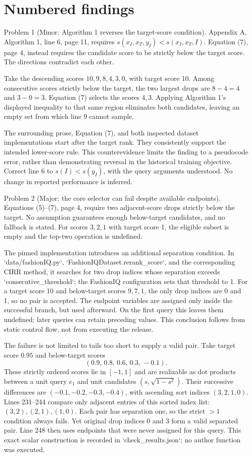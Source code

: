 \documentclass[10pt]{article}
\begin{document}
\section*{Numbered findings}
Problem 1 (Minor: Algorithm 1 reverses the target-score condition).  Appendix A, Algorithm 1, line 6, page 11, requires \(s(x_I,x_T,y_I)<s(x_I,x_T,I)\). Equation (7), page 4, instead requires the candidate score to be strictly below the target score. The directions contradict each other.\par
Take the descending scores \(10,9,8,4,3,0\), with target score 10. Among consecutive scores strictly below the target, the two largest drops are \(8-4=4\) and \(3-0=3\). Equation (7) selects the scores \(4,3\). Applying Algorithm 1’s displayed inequality to that same region eliminates both candidates, leaving an empty set from which line 9 cannot sample.\par
The surrounding prose, Equation (7), and both inspected dataset implementations start after the target rank. They consistently support the intended lower-score rule. This counterevidence limits the finding to a pseudocode error, rather than demonstrating reversal in the historical training objective. Correct line 6 to \(s(I)<s(y_I)\), with the query arguments understood. No change in reported performance is inferred.\par
Problem 2 (Major: the core selector can fail despite available endpoints).  Equations (5)–(7), page 4, require two adjacent-score drops strictly below the target. No assumption guarantees enough below-target candidates, and no fallback is stated. For scores \(3,2,1\) with target score 1, the eligible subset is empty and the top-two operation is undefined.\par
The pinned implementation introduces an additional separation condition. In `data/fashionIQ.py`, `FashionIQDataset.rerank\_score`, and the corresponding CIRR method, it searches for two drop indices whose separation exceeds `consecutive\_threshold`; the FashionIQ configuration sets that threshold to 1. For a target score 10 and below-target scores \(9,7,1\), the only drop indices are 0 and 1, so no pair is accepted. The endpoint variables are assigned only inside the successful branch, but used afterward. On the first query this leaves them undefined; later queries can retain preceding values. This conclusion follows from static control flow, not from executing the release.\par
The failure is not limited to tails too short to supply a valid pair. Take target score \(0.95\) and below-target scores \[(0.9,\,0.8,\,0.6,\,0.3,\,-0.1).\] These strictly ordered scores lie in \([-1,1]\) and are realizable as dot products between a unit query \(e_1\) and unit candidates \((s,\sqrt{1-s^2})\). Their successive differences are \((-0.1,-0.2,-0.3,-0.4)\), with ascending sort indices \((3,2,1,0)\). Lines 231–244 compare only adjacent entries of this sorted index list: \((3,2),(2,1),(1,0)\). Each pair has separation one, so the strict \(>1\) condition always fails. Yet original drop indices 0 and 3 form a valid separated pair. Line 248 then uses endpoints that were never assigned for this query. This exact scalar construction is recorded in `check\_results.json`; no author function was executed.\par
\end{document}
